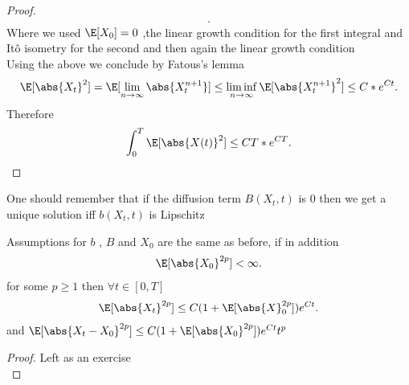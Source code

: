 \begin{proof}
\begin{align*}
   .\end{align*}
   Where we used $\E[X_{0}] = 0$ ,the  linear growth condition for the first integral and It\^o isometry for the second and then again the linear growth condition\\[1ex]
    Using the above we conclude by Fatous's lemma
    \begin{align*}
      \E[\abs{X_t}^2] = \E[\lim_{n\to \infty} \abs{X^{n+1}_t }]  \le  \liminf_{n\to \infty} \E[\abs{X^{n+1}_t }^2] \le C*e^{Ct} 
    .\end{align*}
    Therefore 
    \begin{align*}
      \int_0^{T} \E[\abs{X(t)}^2]  \le  CT*e^{CT} 
    .\end{align*}
\end{proof}
\begin{remark}
  One should remember that if the diffusion term $B(X_t,t)$ is 0 then we get a unique solution iff $b(X_t,t)$ is Lipschitz
\end{remark}
\begin{theorem}
  Assumptions for $b$ , $B$ and $X_{0}$ are the same as before, if in addition 
  \begin{align*}
    \E[\abs{X_0}^{2p} ]< \infty
  .\end{align*}
  for some $p \ge 1$ then $\forall  t \in  [0,T]$ 
  \begin{align*}
    \E[\abs{X_t}^{2p}]\le C(1+\E[\abs{X}_0^{2p} ])e^{Ct} 
  .\end{align*}
  and $\E[\abs{X_t - X_0}^{2p} ] \le  C(1+\E[\abs{X_0}^{2p} ])e^{Ct}t^p $
\end{theorem}
\begin{proof}
 Left as an exercise \\
\end{proof}
